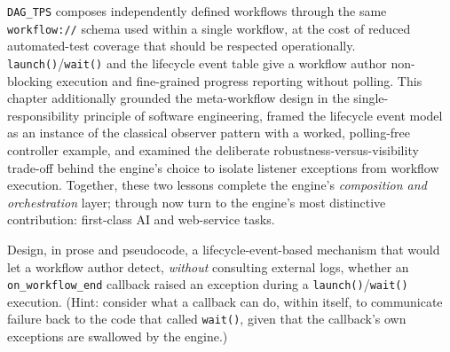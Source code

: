 \texttt{DAG\_TPS} composes independently defined workflows through the same
\texttt{workflow://} schema used within a single workflow, at the cost of
reduced automated-test coverage that should be respected operationally.
\texttt{launch()}/\texttt{wait()} and the lifecycle event table give a
workflow author non-blocking execution and fine-grained progress reporting
without polling. This chapter additionally grounded the meta-workflow design
in the single-responsibility principle of software engineering, framed the
lifecycle event model as an instance of the classical observer pattern with
a worked, polling-free controller example, and examined the deliberate
robustness-versus-visibility trade-off behind the engine's choice to isolate
listener exceptions from workflow execution. Together, these two lessons
complete the engine's \emph{composition and orchestration} layer;
 through  now turn to the engine's
most distinctive contribution: first-class AI and web-service tasks.

\begin{exercise}
Design, in prose and pseudocode, a lifecycle-event-based mechanism that
would let a workflow author detect, \emph{without} consulting external
logs, whether an \texttt{on\_workflow\_end} callback raised an exception
during a \texttt{launch()}/\texttt{wait()} execution. (Hint: consider what a
callback can do, within itself, to communicate failure back to the code that
called \texttt{wait()}, given that the callback's own exceptions are
swallowed by the engine.)
\end{exercise}

